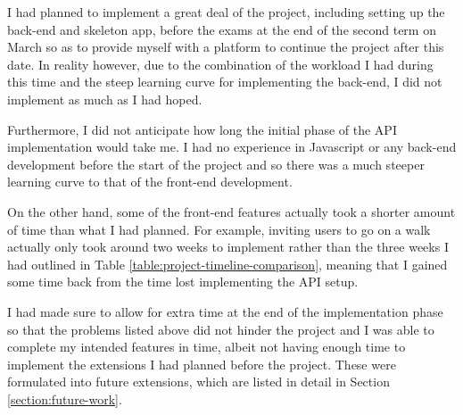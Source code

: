 I had planned to implement a great deal of the project, including setting up the back-end and skeleton app, before the exams at the end of the second term on  March so as to provide myself with a platform to continue the project after this date. In reality however, due to the combination of the workload I had during this time and the steep learning curve for implementing the back-end, I did not implement as much as I had hoped.

Furthermore, I did not anticipate how long the initial phase of the API implementation would take me. I had no experience in Javascript or any back-end development before the start of the project and so there was a much steeper learning curve to that of the front-end development.




On the other hand, some of the front-end features actually took a shorter amount of time than what I had planned. For example, inviting users to go on a walk actually only took around two weeks to implement rather than the three weeks I had outlined in Table \ref{table:project-timeline-comparison}, meaning that I gained some time back from the time lost implementing the API setup.

I had made sure to allow for extra time at the end of the implementation phase so that the problems listed above did not hinder the project and I was able to complete my intended features in time, albeit not having enough time to implement the extensions I had planned before the project. These were formulated into future extensions, which are listed in detail in Section \ref{section:future-work}.

